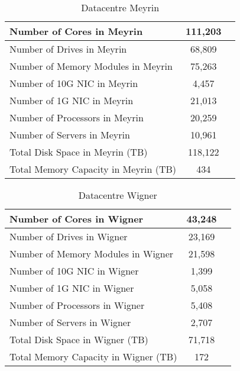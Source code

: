 \begin{table}[H]
    \begin{center}
    \begin{tabular}{|l|c|c}
        \hline
        Number of Cores in Meyrin & 111,203\\
        \hline
        Number of Drives in Meyrin & 68,809\\
        \hline
        Number of Memory Modules in Meyrin & 75,263\\
        \hline
        Number of 10G NIC in Meyrin & 4,457\\
        \hline
        Number of 1G NIC in Meyrin & 21,013\\
        \hline
        Number of Processors in Meyrin & 20,259\\
        \hline
        Number of Servers in Meyrin & 10,961\\
        \hline
        Total Disk Space in Meyrin (TB) & 118,122\\
        \hline
        Total Memory Capacity in Meyrin (TB) & 434\\
        \hline
    \end{tabular}
    \caption[]{Datacentre Meyrin}
    \vspace{2em}
    \end{center}
\end{table}
\begin{table}[H]
    \begin{center}
    \begin{tabular}{|l|c|c}
        \hline
        Number of Cores in Wigner & 43,248\\
        \hline
        Number of Drives in Wigner & 23,169\\
        \hline
        Number of Memory Modules in Wigner & 21,598\\
        \hline
        Number of 10G NIC in Wigner & 1,399\\
        \hline
        Number of 1G NIC in Wigner & 5,058\\
        \hline
        Number of Processors in Wigner & 5,408\\
        \hline
        Number of Servers in Wigner & 2,707\\
        \hline
        Total Disk Space in Wigner (TB) & 71,718\\
        \hline
        Total Memory Capacity in Wigner (TB) & 172\\
        \hline
    \end{tabular}
    \caption[]{Datacentre Wigner}
    \vspace{2em}
    \end{center}
\end{table}
